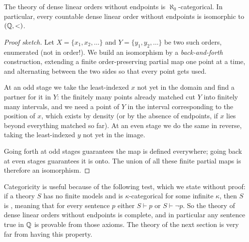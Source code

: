 \documentclass[a4paper]{scrartcl}
\begin{document}
\begin{theorem}[Cantor]
  The theory of dense linear orders without endpoints is $\aleph_0$-categorical. In particular, every countable dense linear order without endpoints is isomorphic to $(\mathbb{Q}, <)$.
\end{theorem}
\begin{proof}[Proof sketch]
  Let $X = \{x_1, x_2, \dots\}$ and $Y = \{y_1, y_2, \dots\}$ be two such orders, enumerated (not in order!). We build an isomorphism by a \emph{back-and-forth} construction, extending a finite order-preserving partial map one point at a time, and alternating between the two sides so that every point gets used.

  At an odd stage we take the least-indexed $x$ not yet in the domain and find a partner for it in $Y$: the finitely many points already matched cut $Y$ into finitely many intervals, and we need a point of $Y$ in the interval corresponding to the position of $x$, which exists by density (or by the absence of endpoints, if $x$ lies beyond everything matched so far). At an even stage we do the same in reverse, taking the least-indexed $y$ not yet in the image.
  \begin{center}
  \end{center}
  Going forth at odd stages guarantees the map is defined everywhere; going back at even stages guarantees it is onto. The union of all these finite partial maps is therefore an isomorphism.
\end{proof}

Categoricity is useful because of the following test, which we state without proof: if a theory $S$ has no finite models and is $\kappa$-categorical for some infinite $\kappa$, then $S$ is , meaning that for every sentence $p$ either $S \vdash p$ or $S \vdash \lnot p$. So the theory of dense linear orders without endpoints is complete, and in particular any sentence true in $\mathbb{Q}$ is provable from those axioms. The theory of the next section is very far from having this property.
\end{document}
